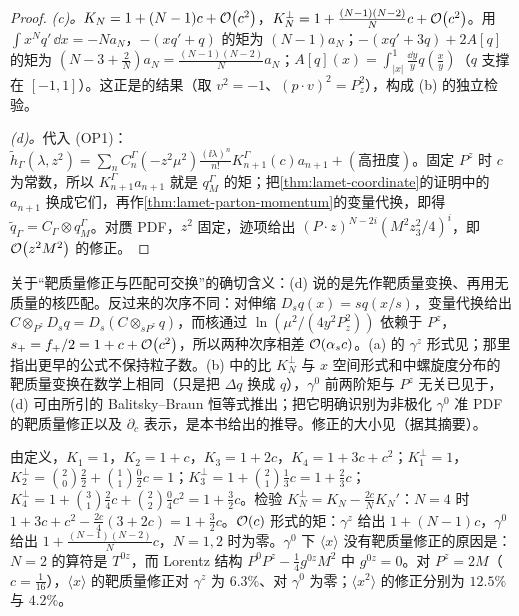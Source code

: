 \begin{proof}
\emph{(c)。}$K_N=1+(N-1)c+\mathcal{O}\!\left(c^2\right)$，$K^\perp_N=1+\frac{(N-1)(N-2)}Nc+\mathcal{O}\!\left(c^2\right)$。用 $\int x^Nq'\,\dd x=-Na_N$，$-(xq'+q)$ 的矩为 $(N-1)a_N$；$-(xq'+3q)+2A[q]$ 的矩为 $(N-3+\frac2N)a_N=\frac{(N-1)(N-2)}Na_N$；$A[q](x)=\int_{|x|}^1\frac{\dd y}yq(\frac xy)$（$q$ 支撑在 $[-1,1]$）。这正是\cite{Braun:2018brg}的结果（取 $v^2=-1$、$(p\cdot v)^2=P_z^2$），构成 (b) 的独立检验。

\emph{(d)。}代入 (OP1)：$\tilde h_\Gamma(\lambda,z^2)=\sum_nC^\Gamma_n(-z^2\mu^2)\frac{(\ii\lambda)^n}{n!}K^\Gamma_{n+1}(c)a_{n+1}+(\text{高扭度})$。固定 $P^z$ 时 $c$ 为常数，所以 $K^\Gamma_{n+1}a_{n+1}$ 就是 $q^\Gamma_M$ 的矩；把\cref{thm:lamet-coordinate}的证明中的 $a_{n+1}$ 换成它们，再作\cref{thm:lamet-parton-momentum}的变量代换，即得 $\tilde q_\Gamma=C_\Gamma\otimes q^\Gamma_M$。对赝 PDF，$z^2$ 固定，迹项给出 $(P\cdot z)^{N-2i}(M^2z_3^2/4)^i$，即 $\mathcal{O}\!\left(z^2M^2\right)$ 的修正。
\end{proof}

关于“靶质量修正与匹配可交换”的确切含义：(d) 说的是先作靶质量变换、再用无质量的核匹配。反过来的次序不同：对伸缩 $D_sq(x)=sq(x/s)$，变量代换给出 $C\otimes_{P^z}D_sq=D_s(C\otimes_{sP^z}q)$，而核通过 $\ln(\mu^2/(4y^2P_z^2))$ 依赖于 $P^z$，$s_+=f_+/2=1+c+\mathcal{O}\!\left(c^2\right)$，所以两种次序相差 $\mathcal{O}\!\left(\alpha_s c\right)$。(a) 的 $\gamma^z$ 形式见\cite[附录~B]{Chen:2016utp}；那里指出更早的公式\cite{Alexandrou:2015rja}不保持粒子数。(b) 中的比 $K^\perp_N$ 与 $x$ 空间形式和\cite{Chen:2016utp}中螺旋度分布的靶质量变换在数学上相同（只是把 $\Delta q$ 换成 $q$），$\gamma^0$ 前两阶矩与 $P^z$ 无关已见于\cite{Bhattacharya:2019cme}，(d) 可由\cite{Braun:2018brg}所引的 Balitsky--Braun 恒等式推出；把它明确识别为非极化 $\gamma^0$ 准 PDF 的靶质量修正以及 $\partial_c$ 表示，是本书给出的推导。修正的大小见\cite{Radyushkin:2017ffo}（据其摘要）。

\begin{example}[$K_N$ 与 $K^\perp_N$（$N\le4$）]\label{ex:lamet-tmc-moments}
由定义，$K_1=1$，$K_2=1+c$，$K_3=1+2c$，$K_4=1+3c+c^2$；$K^\perp_1=1$，$K^\perp_2=\binom20\frac22+\binom11\frac02c=1$；$K^\perp_3=1+\binom21\frac13c=1+\frac23c$；$K^\perp_4=1+\binom31\frac24c+\binom22\frac04c^2=1+\frac32c$。检验 $K^\perp_N=K_N-\frac{2c}NK_N'$：$N=4$ 时 $1+3c+c^2-\frac{2c}4(3+2c)=1+\frac32c$。$\mathcal{O}\!\left(c\right)$ 形式的矩：$\gamma^z$ 给出 $1+(N-1)c$，$\gamma^0$ 给出 $1+\frac{(N-1)(N-2)}Nc$，$N=1,2$ 时为零。$\gamma^0$ 下 $\langle x\rangle$ 没有靶质量修正的原因是：$N=2$ 的算符是 $T^{0z}$，而 Lorentz 结构 $P^0P^z-\frac14g^{0z}M^2$ 中 $g^{0z}=0$。对 $P^z=2M$（$c=\frac1{16}$），$\langle x\rangle$ 的靶质量修正对 $\gamma^z$ 为 $6.3\%$、对 $\gamma^0$ 为零；$\langle x^2\rangle$ 的修正分别为 $12.5\%$ 与 $4.2\%$。
\end{example}

